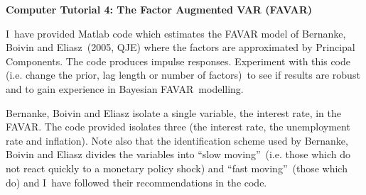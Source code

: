 \documentclass{article}
\begin{document}
\begin{center}
\textbf{Computer Tutorial 4: The Factor Augmented VAR (FAVAR)}
\end{center}

\bigskip 

I\ have provided Matlab code which estimates the FAVAR model of Bernanke,
Boivin and Eliasz\ (2005, QJE) where the factors are approximated by
Principal Components. The code produces impulse responses. Experiment with
this code (i.e. change the prior, lag length or number of factors)\ to see
if results are robust and to gain experience in Bayesian FAVAR\ modelling. 

Bernanke, Boivin and Eliasz isolate a single variable, the interest rate, in
the FAVAR. The code provided isolates three (the interest rate, the
unemployment rate and inflation). Note also that the identification scheme
used by Bernanke, Boivin and Eliasz divides the variables into
\textquotedblleft slow moving\textquotedblright\ (i.e. those which do not
react quickly to a monetary policy shock) and \textquotedblleft fast
moving\textquotedblright\ (those which do) and I\ have followed their
recommendations in the code. 
\end{document}
